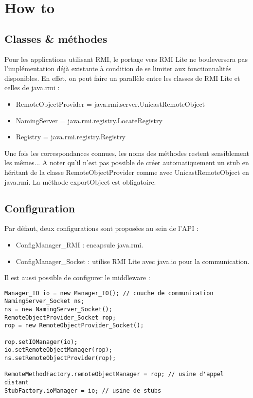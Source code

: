 \chapter{How to}

\section{Classes \& méthodes}
Pour les applications utilisant RMI, le portage vers RMI Lite ne bouleversera pas l'implémentation déjà existante à condition de se limiter aux fonctionnalités disponibles. En effet, on peut faire un parallèle entre les classes de RMI Lite et celles de java.rmi :
\begin{itemize}
\item RemoteObjectProvider = java.rmi.server.UnicastRemoteObject
\item NamingServer = java.rmi.registry.LocateRegistry
\item Registry = java.rmi.registry.Registry
\end{itemize}
\medskip

Une fois les correspondances connues, les noms des méthodes restent sensiblement les mêmes... A noter qu'il n'est pas possible de créer automatiquement un stub en héritant de la classe RemoteObjectProvider comme avec UnicastRemoteObject en java.rmi. La méthode exportObject est obligatoire.

\section{Configuration}
\hspace{-.6cm}Par défaut, deux configurations sont proposées au sein de l'API : 
\begin{itemize}
\item ConfigManager\_RMI : encapsule java.rmi.
\item ConfigManager\_Socket : utilise RMI Lite avec java.io pour la communication.
\end{itemize}
\medskip
Il est aussi possible de configurer le middleware :
\begin{lstlisting}
Manager_IO io = new Manager_IO(); // couche de communication
NamingServer_Socket ns;
ns = new NamingServer_Socket();
RemoteObjectProvider_Socket rop;
rop = new RemoteObjectProvider_Socket();

rop.setIOManager(io);
io.setRemoteObjectManager(rop);
ns.setRemoteObjectProvider(rop);

RemoteMethodFactory.remoteObjectManager = rop; // usine d'appel distant
StubFactory.ioManager = io; // usine de stubs
\end{lstlisting}

